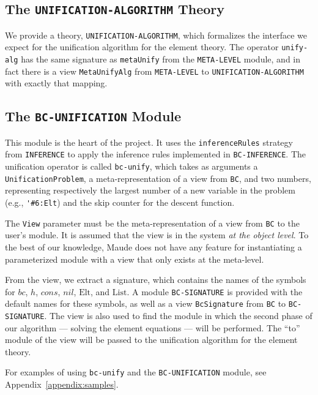 \documentclass[11pt]{article}
\newcommand{\Elt}{\mathrm{Elt}}
\newcommand{\List}{\mathrm{List}}
\newcommand{\Bc}{\mathit{bc}}
\newcommand{\Hh}{\mathit{h}}
\newcommand{\Cons}{\mathit{cons}}
\newcommand{\Nil}{\mathit{nil}}
\newcommand{\TitleListing}[1]{\texorpdfstring{\lstinline|#1|}{#1}}
\begin{document}
\subsection{The \TitleListing{UNIFICATION-ALGORITHM} Theory}
\label{subsection:unif-alg-mod}

We provide a theory, \lstinline|UNIFICATION-ALGORITHM|, which formalizes the
interface we expect for the unification algorithm for the element theory. The
operator \lstinline|unify-alg| has the same signature as \lstinline|metaUnify|
from the \lstinline|META-LEVEL| module, and in fact there is a view
\lstinline|MetaUnifyAlg| from \lstinline|META-LEVEL| to
\lstinline|UNIFICATION-ALGORITHM| with exactly that mapping.

\subsection{The \TitleListing{BC-UNIFICATION} Module}
\label{subsection:bc-unif-mod}

This module is the heart of the project. It uses the \lstinline|inferenceRules|
strategy from \lstinline|INFERENCE| to apply the inference rules implemented
in \lstinline|BC-INFERENCE|. The unification operator is called
\lstinline|bc-unify|, which takes as arguments a
\lstinline|UnificationProblem|, a meta-representation of a view from
\lstinline|BC|, and two numbers, representing respectively the largest number
of a new variable in the problem (e.g., \lstinline|'#6:Elt|) and the skip
counter for the descent function.

The \lstinline|View| parameter must be the meta-representation of a view from
\lstinline|BC| to the user's module. It is assumed that the view is in the
system \emph{at the object level}. To the best of our knowledge, Maude does not
have any feature for instantiating a parameterized module with a view that only
exists at the meta-level.

From the view, we extract a signature, which contains the names of the symbols
for $\Bc$, $\Hh$, $\Cons$, $\Nil$, $\Elt$, and $\List$. A module
\lstinline|BC-SIGNATURE| is provided with the default names for these symbols, as
well as a view \lstinline|BcSignature| from \lstinline|BC| to
\lstinline|BC-SIGNATURE|. The view is also used to find the module in which
the second phase of our algorithm --- solving the element equations --- will be
performed. The ``to'' module of the view will be passed to the unification
algorithm for the element theory.

For examples of using \lstinline|bc-unify| and the \lstinline|BC-UNIFICATION|
module, see Appendix~\ref{appendix:samples}.
\end{document}
